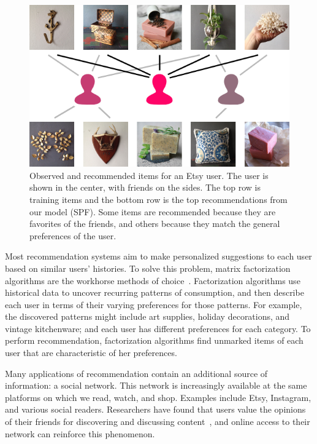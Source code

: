 \documentclass{sig-alternate-2013}
\begin{document}
\addtocounter{footnote}{-1}
\begin{figure}[t]
\centering
\includegraphics[width=\columnwidth]{../fig/tutorial.png}
\caption[what?]{Observed and recommended items\footnotemark{} for an Etsy user.  The user is shown in the center, with friends on the sides.  The top row
is training items and the bottom row is the top recommendations
from our model (SPF).  Some items are recommended because they are favorites of the friends, and others
because they match the general preferences of the user.}\label{fig:intuition}
\end{figure}

Most recommendation systems aim to make personalized suggestions to
each user based on similar users' histories.  To solve this problem, matrix factorization
algorithms are the workhorse methods of choice~\cite{Koren09, CFsurvey}. Factorization
algorithms use historical data to uncover recurring patterns of
consumption, and then describe each user in terms of their varying
preferences for those patterns. For example, the discovered patterns
might include art supplies, holiday decorations, and vintage
kitchenware; and each user has different preferences for each
category.  To perform recommendation, factorization algorithms find
unmarked items of each user that are characteristic of her
preferences.

Many applications of recommendation contain an additional source of
information: a social network.  This network is increasingly available at
the same platforms on which we read, watch, and shop. Examples
include Etsy, Instagram, and various social readers.
Researchers have found that users value the opinions of their friends
for discovering and discussing content~\cite{Johnstone1957,Volz2006},
and online access to their network can reinforce this phenomenon.
\end{document}
